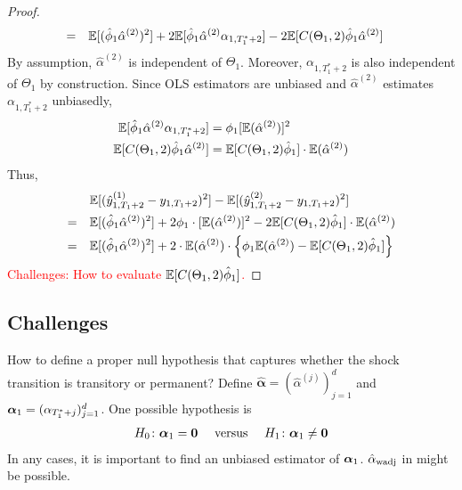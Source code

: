 \documentclass[12pt]{article}
\begin{document}
\begin{proof}
\begin{align*}
= \quad & \mathbb{E}[(\hat{\phi}_1\hat{\alpha}^{(2)})^2] + 2 \mathbb{E} [\hat{\phi}_1 \hat{\alpha}^{(2)} \alpha_{1, T_1^*+2}] -2 \mathbb{E}[C(\Theta_1, 2) \hat{\phi}_{1}\hat{\alpha}^{(2)}]
\end{align*}
By assumption, $\hat{\alpha}^{(2)}$ is independent  of $\Theta_1$.  Moreover, $\alpha_{1, T_1^*+2}$ is also independent  of $\Theta_1$ by construction. Since OLS estimators are unbiased and $\hat{\alpha}^{(2)}$ estimates $\alpha_{1, T_1^*+2}$ unbiasedly, 
\begin{align*}
  \mathbb{E} [\hat{\phi}_1 \hat{\alpha}^{(2)} \alpha_{1, T_1^*+2}] &= \phi_1 [\mathbb{E} (\hat{\alpha}^{(2)})]^2\\
  \mathbb{E} [C(\Theta_1, 2)\hat{\phi}_1 \hat{\alpha}^{(2)}] &=  \mathbb{E}[C(\Theta_1, 2) \hat{\phi}_1 ] \cdot \mathbb{E}(\hat{\alpha}^{(2)})
\end{align*}
Thus,
\begin{align*}
 & \mathbb{E} [(\hat{y}_{1,T_1+2}^{(1)}-y_{1, T_1+2})^2] -  \mathbb{E} [(\hat{y}_{1,T_1+2}^{(2)}-y_{1, T_1+2})^2] \\
= \quad & \mathbb{E}[(\hat{\phi}_1\hat{\alpha}^{(2)})^2] + 2 \phi_1 \cdot [\mathbb{E} (\hat{\alpha}^{(2)})]^2 -2 \mathbb{E}[C(\Theta_1, 2) \hat{\phi}_1 ] \cdot \mathbb{E}(\hat{\alpha}^{(2)}) \\
= \quad & \mathbb{E}[(\hat{\phi}_1\hat{\alpha}^{(2)})^2]  + 2\cdot \mathbb{E}(\hat{\alpha}^{(2)}) \cdot  \Big\{\phi_1 \mathbb{E} (\hat{\alpha}^{(2)}) - \mathbb{E}[C(\Theta_1, 2) \hat{\phi}_1] \Big\}
\end{align*}
\textcolor{red}{Challenges: How to evaluate $\mathbb{E}[C(\Theta_1, 2) \hat{\phi}_1]$.}
\end{proof}




\subsection{Challenges}

\begin{challenges}
  How to define a proper null hypothesis that captures whether the shock transition is  transitory or permanent?   Define $ \hat{\boldsymbol{\alpha}} = (\hat{\alpha}^{(j)})_{j=1}^d$ and $\boldsymbol{\alpha}_1= (\alpha_{T_1^*+j})_{j=1}^d$. One possible hypothesis is
  \begin{align*}
    H_0 \colon \boldsymbol{\alpha}_1=\boldsymbol{0} 
    \quad \text{ versus } \quad 
    H_1 \colon \boldsymbol{\alpha}_1 \neq \boldsymbol{0} 
  \end{align*}
  In any cases, it is important to find an unbiased estimator of $\boldsymbol{\alpha}_1$. $\hat{\alpha}_{\rm wadj}$ in \citep{lin2020minimizing} might be possible. 
\end{challenges}
\end{document}
